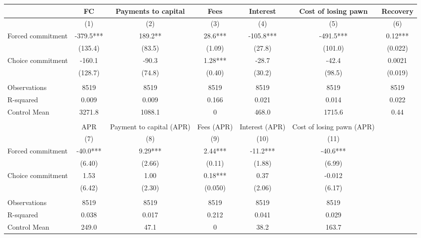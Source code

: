 \begin{tabular}{lcccccc}
\toprule
      & FC    & Payments to capital & Fees  & Interest & Cost of losing pawn & Recovery \\
\midrule
      & (1)   & (2)   & (3)   & (4)   & (5)   & (6) \\
\midrule
\midrule
Forced commitment & -379.5*** & 189.2** & 28.6*** & -105.8*** & -491.5*** & 0.12*** \\
      & (135.4) & (83.5) & (1.09) & (27.8) & (101.0) & (0.022) \\
Choice commitment & -160.1 & -90.3 & 1.28*** & -28.7 & -42.4 & 0.0021 \\
      & (128.7) & (74.8) & (0.40) & (30.2) & (98.5) & (0.019) \\
      &       &       &       &       &       &  \\
\midrule
Observations & 8519  & 8519  & 8519  & 8519  & 8519  & 8519 \\
R-squared & 0.009 & 0.009 & 0.166 & 0.021 & 0.014 & 0.022 \\
Control Mean & 3271.8 & 1088.1 & 0     & 468.0 & 1715.6 & 0.44 \\
\midrule
\midrule
      &       &       &       &       &       &  \\
\midrule
      & APR   & Payment to capital (APR) & Fees (APR) & Interest (APR) & Cost of losing pawn (APR) &  \\
\midrule
      & (7)   & (8)   & (9)   & (10)  & (11)  &  \\
\midrule
\midrule
Forced commitment & -40.0*** & 9.29*** & 2.44*** & -11.2*** & -40.6*** &  \\
      & (6.40) & (2.66) & (0.11) & (1.88) & (6.99) &  \\
Choice commitment & 1.53  & 1.00  & 0.18*** & 0.37  & -0.012 &  \\
      & (6.42) & (2.30) & (0.050) & (2.06) & (6.17) &  \\
      &       &       &       &       &       &  \\
\midrule
Observations & 8519  & 8519  & 8519  & 8519  & 8519  &  \\
R-squared & 0.038 & 0.017 & 0.212 & 0.041 & 0.029 &  \\
Control Mean & 249.0 & 47.1  & 0     & 38.2  & 163.7 &  \\
\bottomrule
\bottomrule
\end{tabular}%
